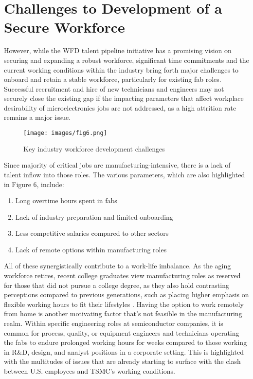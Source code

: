 \section{Challenges to Development of a Secure Workforce}\label{sec5:challenges}
However, while the WFD talent pipeline initiative has a promising vision on securing and expanding a robust workforce, significant time commitments and the current working conditions within the industry bring forth major challenges to onboard and retain a stable workforce, particularly for existing fab roles. Successful recruitment and hire of new technicians and engineers may not securely close the existing gap if the impacting parameters that affect workplace desirability of microelectronics jobs are not addressed, as a high attrition rate remains a major issue.

\begin{figure*}
    \centering
    \texttt{[image: images/fig6.png]}
    \caption{Key industry workforce development challenges}
    \label{fig:6}
\end{figure*}

Since majority of critical jobs are manufacturing-intensive, there is a lack of talent inflow into those roles. 
The various parameters, which are also highlighted in Figure 6, include:
\begin{enumerate} 
    \item Long overtime hours spent in fabs
    \item Lack of industry preparation and limited onboarding
    \item Less competitive salaries compared to other sectors
   \item Lack of remote options within manufacturing roles
\end{enumerate}
All of these synergistically contribute to a work-life imbalance. As the aging workforce retires, recent college graduates view manufacturing roles as reserved for those that did not pursue a college degree, as they also hold contrasting perceptions compared to previous generations, such as placing higher emphasis on flexible working hours to fit their lifestyles \cite{Deichler2021-gv}. Having the option to work remotely from home is another motivating factor that’s not feasible in the manufacturing realm. Within specific engineering roles at semiconductor companies, it is common for process, quality, or equipment engineers and technicians operating the fabs to endure prolonged working hours for weeks compared to those working in R\&D, design, and analyst positions in a corporate setting. This is highlighted with the multitudes of issues that are already starting to surface with the clash between U.S. employees and TSMC's working conditions. 

